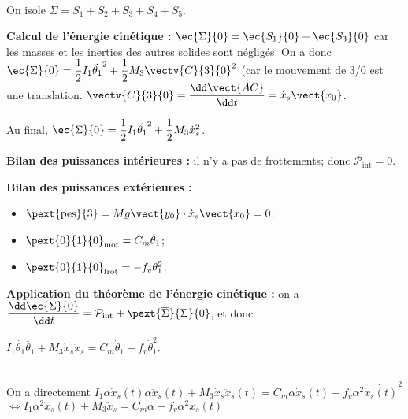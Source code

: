 \ifprof
\begin{corrige}~\\
On isole $\Sigma = S_1 +S_2 + S_3 + S_4 + S_5$.

\textbf{Calcul de l'énergie cinétique :} $\ec{\Sigma}{0}=\ec{S_1}{0}+\ec{S_3}{0}$ car les masses et les inerties des autres solides sont négligés.  On a donc $\ec{\Sigma}{0}=\dfrac{1}{2}I_1\dot{\theta_1}^2 + \dfrac{1}{2}M_3 \vectv{C}{3}{0} ^2$ (car le mouvement de 3/0 est une translation. $\vectv{C}{3}{0}=\dfrac{\dd \vect{AC}}{\dd t}=\dot{x}_s \vect{x_0}$.

Au final, $\ec{\Sigma}{0}=\dfrac{1}{2}I_1\dot{\theta_1}^2 + \dfrac{1}{2}M_3\dot{x}_s ^2$.

\textbf{Bilan des puissances intérieures :} il n'y a pas de frottements; donc  $\mathcal{P}_{\text{int}}=0$.

\textbf{Bilan des puissances extérieures :}
\begin{itemize}
\item $\pext{\text{pes}}{3}=Mg\vect{y_0}\cdot \dot{x}_s \vect{x_0} = 0$;
\item $\pext{0}{1}{0}_{\text{mot}}=C_m\dot{\theta}_1$;
\item $\pext{0}{1}{0}_{\text{frot}}=-f_v\dot{\theta}_1^2$.
\end{itemize}

\textbf{Application du théorème de l'énergie cinétique :} on a $\dfrac{\dd \ec{\Sigma}{0} }{\dd t}=\mathcal{P}_{\text{int}} + \pext{\overline{\Sigma}}{\Sigma}{0}$, et donc 

$ I_1\dot{\theta_1}\ddot{\theta_1} + M_3\dot{x}_s\ddot{x}_s =C_m\dot{\theta}_1 -f_v\dot{\theta}_1^2$.


\end{corrige}
\else
\fi


\ifprof
\begin{corrige}~\\
On a directement $ I_1\alpha \dot{x}_s(t)\alpha \ddot{x}_s(t) + M_3\dot{x}_s\ddot{x}_s(t) =C_m\alpha \dot{x}_s(t) -f_v\alpha^2\dot{ x_s(t)}^2$
$\Leftrightarrow 
 I_1\alpha^2 \ddot{x}_s(t) + M_3\ddot{x}_s =C_m\alpha  -f_v\alpha^2 \dot{x}_s(t)$
\end{corrige}
\else
\fi


